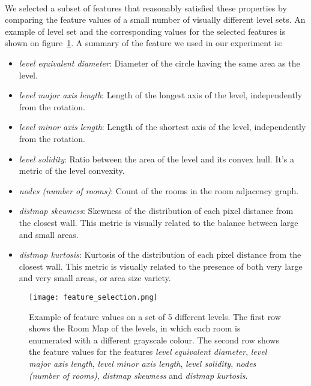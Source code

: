 \paragraph{} We selected a subset of features that reasonably satisfied these properties by comparing the feature values of a small number of visually different level sets. An example of level set and the corresponding values for the selected features is shown on figure~\ref{fig:feature_selection}. A summary of the feature we used in our experiment is:
\begin{itemize}
	\item \textit{level equivalent diameter}: Diameter of the circle having the same area as the level.
	\item \textit{level major axis length}: Length of the longest axis of the level, independently from the rotation.
	\item \textit{level minor axis length}: Length of the shortest axis of the level, independently from the rotation.
	\item \textit{level solidity}: Ratio between the area of the level and its convex hull. It's a metric of the level convexity.
	\item \textit{nodes (number of rooms)}: Count of the rooms in the room adjacency graph.
	\item \textit{distmap skewness}: Skewness of the distribution of each pixel distance from the closest wall. This metric is visually related to the balance between large and small areas.
	\item \textit{distmap kurtosis}: Kurtosis of the distribution of each pixel distance from the closest wall. This metric is visually related to the presence of both very large and very small areas, or area size variety.
\end{itemize}


 \begin{figure}[h!]
 	\texttt{[image: feature\_selection.png]}
 	\caption[Example of feature values]{Example of feature values on a set of 5 different levels. The first row shows the Room Map of the levels, in which each room is enumerated with a different grayscale colour. The second row shows the feature values for the features \textit{level equivalent diameter}, \textit{level major axis length}, \textit{level minor axis length}, \textit{level solidity}, \textit{nodes (number of rooms)}, \textit{distmap skewness} and \textit{distmap kurtosis}. }
 	\label{fig:feature_selection}
 \end{figure}

